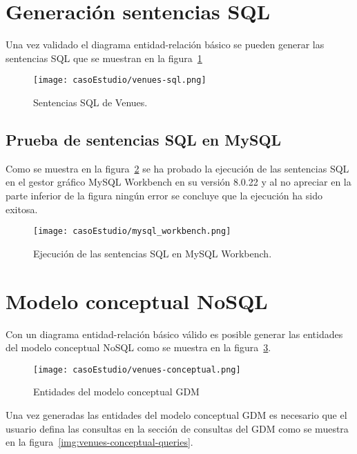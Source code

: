 \section{Generación sentencias SQL}
 Una vez validado el diagrama entidad-relación básico se pueden generar las sentencias SQL que se muestran en la figura~\ref{img:venues-sql} 

 \begin{figure}[H]
    \centering
    \texttt{[image: casoEstudio/venues-sql.png]}
    \caption{Sentencias SQL de Venues.}
    \label{img:venues-sql}
\end{figure}

\subsection*{Prueba de sentencias SQL en MySQL}

Como se muestra en la figura~\ref{img:mysql_workbench} se ha probado la ejecución de las sentencias SQL en el gestor gráfico MySQL Workbench en su versión 8.0.22 y al no apreciar en la parte inferior de la figura ningún error se concluye que la ejecución ha sido exitosa.

\begin{figure}[H]
  \centering
  \texttt{[image: casoEstudio/mysql\_workbench.png]}
  \caption{Ejecución de las sentencias SQL en MySQL Workbench.}
  \label{img:mysql_workbench}
\end{figure}

\section{Modelo conceptual NoSQL}

Con un diagrama entidad-relación básico válido es posible generar las entidades del modelo conceptual NoSQL como se muestra en la figura~\ref{img:venues-conceptual}.

\begin{figure}[H]
    \centering
    \texttt{[image: casoEstudio/venues-conceptual.png]}
    \caption{Entidades del modelo conceptual GDM}
    \label{img:venues-conceptual}
\end{figure}

Una vez generadas las entidades del modelo conceptual GDM es necesario que el usuario defina las consultas en la sección de consultas del GDM como se muestra en la figura~\ref{img:venues-conceptual-queries}.

